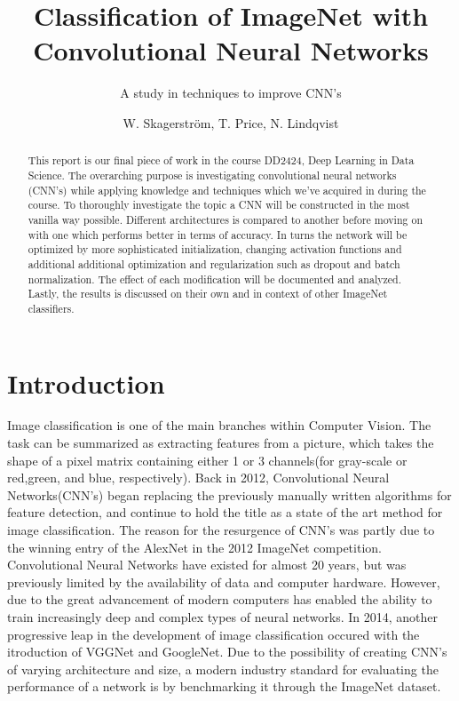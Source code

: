 \documentclass{kthreport}
\title{Classification of ImageNet with Convolutional Neural Networks}
\subtitle{A study in techniques to improve CNN's}
\author{W. Skagerström, T. Price, N. Lindqvist}
\begin{document}
\maketitle
\newpage
\begin{abstract}

\noindent
This report is our final piece of work in the course DD2424, Deep Learning in Data Science. The overarching purpose is investigating convolutional neural networks (CNN's) while applying knowledge and techniques which we've acquired in during the course.
\noindent
To thoroughly investigate the topic a CNN will be constructed in the most vanilla way possible. Different architectures is compared to another before moving on with one which performs better in terms of accuracy. In turns the network will be optimized by more sophisticated initialization, changing activation functions and additional additional optimization and regularization such as dropout and batch normalization. The effect of each modification will be documented and analyzed. Lastly, the results is discussed on their own and in context of other ImageNet classifiers.
\end{abstract}
\newpage

\tableofcontents
\newpage

\section{Introduction}
Image classification is one of the main branches within Computer Vision. The task can be summarized as extracting features from a picture, which takes the shape of a pixel matrix containing either 1 or 3 channels(for gray-scale or red,green, and blue, respectively). Back in 2012, Convolutional Neural Networks(CNN's) began replacing the previously manually written algorithms for feature detection, and continue to hold the title as a state of the art method for image classification. The reason for the resurgence of CNN's was partly due to the winning entry of the AlexNet in the 2012 ImageNet competition\cite{krizhevsky2012imagenet}. Convolutional Neural Networks have existed for almost 20 years, but was previously limited by the availability of data and computer hardware. However, due to the great advancement of modern computers has enabled the ability to train increasingly deep and complex types of neural networks. In 2014, another progressive leap in the development of image classification occured with the itroduction of VGGNet and GoogleNet\cite{simonyan2014very}\cite{szegedy2016rethinking}.  Due to the possibility of creating CNN's of varying architecture and size, a modern industry standard for evaluating the performance of a network is by benchmarking it through the ImageNet dataset\cite{russakovsky2015imagenet}. 
\end{document}
